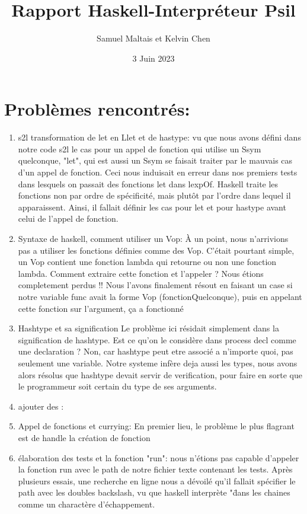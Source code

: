 \documentclass{article}
\title{Rapport Haskell-Interpréteur Psil}
\author{Samuel Maltais et Kelvin Chen}
\date{3 Juin 2023}
\begin{document}
\maketitle

\section*{Problèmes rencontrés:}
\begin{enumerate}
    \item s2l transformation de let en Llet et de hastype:
    vu que nous avons défini dans notre code s2l le cas pour un appel de fonction qui utilise un Ssym quelconque, "let", qui est aussi un Ssym se faisait traiter par le mauvais cas d'un appel de fonction. Ceci nous induisait en erreur dans nos premiers tests dans lesquels on passait des fonctions let dans lexpOf. Haskell traite les fonctions non par ordre de spécificité, mais plutôt par l'ordre dans lequel il apparaissent. Ainsi, il fallait définir les cas pour let et pour hastype avant celui de l'appel de fonction. 
    
    \item Syntaxe de haskell, comment utiliser un Vop:
    À un point, nous n'arrivions pas a utiliser les fonctions définies comme des Vop. C'était pourtant simple, un Vop contient une fonction lambda qui retourne ou non une fonction lambda. Comment extraire cette fonction et l'appeler ? Nous étions completement perdus !! Nous l'avons finalement résout en faisant un case si notre variable func avait la forme Vop (fonctionQuelconque), puis en appelant cette fonction sur l'argument, ça a fonctionné
    
    \item Hashtype et sa signification
    Le problème ici résidait simplement dans la signification de hashtype. Est ce qu'on le considère dans process decl comme une declaration ? Non, car hashtype peut etre associé a n'importe quoi, pas seulement une variable. Notre systeme infère deja aussi les types, nous avons alors résolus que hashtype devait servir de verification, pour faire en sorte que le programmeur soit certain du type de ses arguments.
    
    \item ajouter des :

    
    
    
    \item Appel de fonctions et currying:
    En premier lieu, le problème le plus flagrant est de handle la création de fonction
     \item élaboration des tests et la fonction "run": 
     nous n'étions pas capable d'appeler la fonction run avec le path de notre fichier texte contenant les tests. Après plusieurs essais, une recherche en ligne nous a dévoilé qu'il fallait spécifier le path avec les doubles backslash, vu que haskell interprète "\" dans les chaines comme un charactère d'échappement. 
\end{enumerate}
\end{document}
